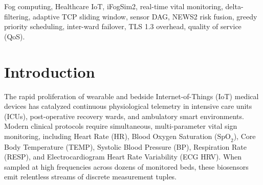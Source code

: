 \documentclass[conference]{IEEEtran}
\begin{document}
\begin{IEEEkeywords}
Fog computing, Healthcare IoT, iFogSim2, real-time vital monitoring, delta-filtering, adaptive TCP sliding window, sensor DAG, NEWS2 risk fusion, greedy priority scheduling, inter-ward failover, TLS 1.3 overhead, quality of service (QoS).
\end{IEEEkeywords}

\section{Introduction}
The rapid proliferation of wearable and bedside Internet-of-Things (IoT) medical devices has catalyzed continuous physiological telemetry in intensive care units (ICUs), post-operative recovery wards, and ambulatory smart environments. Modern clinical protocols require simultaneous, multi-parameter vital sign monitoring, including Heart Rate (HR), Blood Oxygen Saturation ($\text{SpO}_2$), Core Body Temperature (TEMP), Systolic Blood Pressure (BP), Respiration Rate (RESP), and Electrocardiogram Heart Rate Variability (ECG HRV). When sampled at high frequencies across dozens of monitored beds, these biosensors emit relentless streams of discrete measurement tuples.
\end{document}
